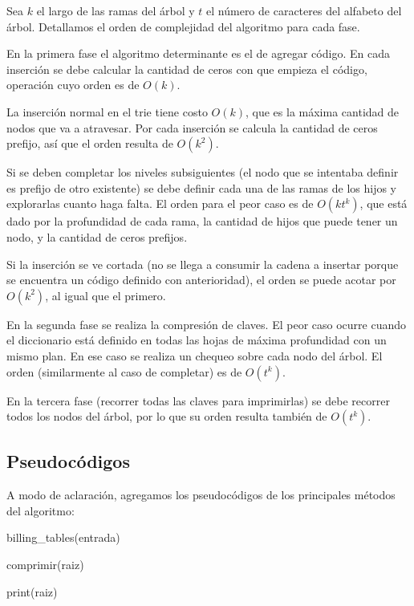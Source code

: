 Sea $k$ el largo de las ramas del árbol y $t$ el número de caracteres del
alfabeto del árbol. Detallamos el orden de complejidad del algoritmo para cada fase.

En la primera fase el algoritmo determinante es el de agregar código. En cada
inserción se debe calcular la cantidad de ceros con que empieza el
código, operación cuyo orden es de $O(k)$.

La inserción normal en el trie tiene costo $O(k)$, que es la máxima cantidad
de nodos que va a atravesar. Por cada inserción se calcula la cantidad de
ceros prefijo, así que el orden resulta de $O(k^2)$.

Si se deben completar los niveles subsiguientes (el nodo que se intentaba
definir es prefijo de otro existente) se debe definir cada una de las ramas
de los hijos y explorarlas cuanto haga falta. El orden para el peor caso es
de $O(kt^k)$, que está dado por la profundidad de cada rama, la cantidad
de hijos que puede tener un nodo, y la cantidad de ceros prefijos.

Si la inserción se ve cortada (no se llega a consumir la cadena a insertar
porque se encuentra un código definido con anterioridad), el orden se puede
acotar por $O(k^2)$, al igual que el primero.

En la segunda fase se realiza la compresión de claves. El peor caso ocurre
cuando el diccionario está definido en todas las hojas de máxima profundidad
con un mismo plan. En ese caso se realiza un chequeo sobre cada nodo del árbol.
El orden (similarmente al caso de completar) es de $O(t^k)$.

En la tercera fase (recorrer todas las claves para imprimirlas) se debe
recorrer todos los nodos del árbol, por lo que su orden resulta también de
$O(t^k)$.

\subsection*{Pseudocódigos}

A modo de aclaración, agregamos los pseudocódigos de los principales métodos del algoritmo:

\begin{algorithm}[H]
\linesnumbered
\caption{billing\_tables(entrada)}
\vspace{0.4cm}

comprimir(raiz)

print(raiz)
\end{algorithm}

